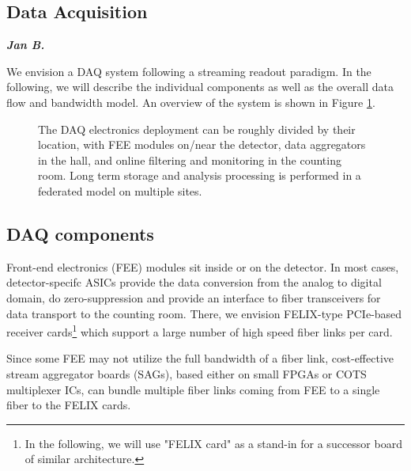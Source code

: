 \subsection{Data Acquisition}
\textbf{\emph{Jan B.}}

We envision a DAQ system following a streaming readout paradigm. In the following, we will describe the individual components as well as the overall data flow and bandwidth model. An overview of the system is shown in Figure \ref{fig:data_acquisition_diagram}.


\begin{figure}[hbt!]
 \begin{center}
  
  
  \caption[Data Acquisition Diagram]{\label{fig:data_acquisition_diagram} The DAQ electronics deployment can be roughly divided by their location, with FEE modules on/near the detector, data aggregators in the hall, and online filtering and monitoring in the counting room. Long term storage and analysis processing is performed in a federated model on multiple sites. }
 \end{center}
\end{figure}


\subsection{DAQ components}
 Front-end electronics (FEE) modules sit inside or on the detector. In most cases, detector-specifc ASICs provide the data conversion from the analog to digital domain, do zero-suppression and provide an interface to fiber transceivers for data transport to the counting room.  There, we envision FELIX-type PCIe-based receiver cards\footnote{In the following, we will use "FELIX card" as a stand-in for a successor board of similar architecture.} which support a large number of high speed fiber links per card.  

Since some FEE may not utilize the full bandwidth of a fiber link, cost-effective stream aggregator boards (SAGs), based either on small FPGAs or COTS multiplexer ICs, can bundle multiple fiber links coming from FEE to a single fiber to the FELIX cards. 

